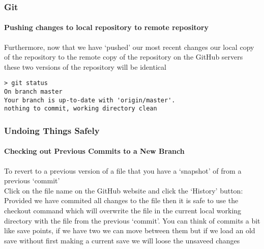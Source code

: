 \documentclass[xcolor=dvipsnames]{beamer}
\begin{document}
\begin{frame}[fragile]
\frametitle{Git}
\framesubtitle{Pushing changes to local repository to remote repository}
Furthermore, now that we have `pushed' our most recent changes our local copy of the repository to the remote copy of the repository on the GitHub servers these two versions of the repository will be identical
\newline
\begin{block}{}
\begin{lstlisting}
> git status
On branch master
Your branch is up-to-date with 'origin/master'.
nothing to commit, working directory clean
\end{lstlisting}
\end{block}
\end{frame}



\begin{frame} 
\frametitle{Undoing Things Safely}
\framesubtitle{Checking out Previous Commits to a New Branch}
To revert to a previous version of a file that you have a `snapshot' of from a previous `commit'\\
Click on the file name on the GitHub website and click the `History' button:
\newline
\newline
Provided we have commited all changes to the file then it is safe to use the checkout command which will overwrite the file in the current local working directory with the file from the previous `commit'.
\newline
\newline
You can think of commits a bit like save points, if we have two we can move between them but if we load an old save without first making a current save we will loose the unsaveed changes
\end{frame}
\end{document}
